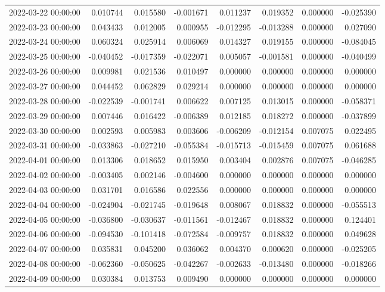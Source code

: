 \begin{tabular}{lrrrrrrr}
2022-03-22 00:00:00 & 0.010744 & 0.015580 & -0.001671 & 0.011237 & 0.019352 & 0.000000 & -0.025390 \\
2022-03-23 00:00:00 & 0.043433 & 0.012005 & 0.000955 & -0.012295 & -0.013288 & 0.000000 & 0.027090 \\
2022-03-24 00:00:00 & 0.060324 & 0.025914 & 0.006069 & 0.014327 & 0.019155 & 0.000000 & -0.084045 \\
2022-03-25 00:00:00 & -0.040452 & -0.017359 & -0.022071 & 0.005057 & -0.001581 & 0.000000 & -0.040499 \\
2022-03-26 00:00:00 & 0.009981 & 0.021536 & 0.010497 & 0.000000 & 0.000000 & 0.000000 & 0.000000 \\
2022-03-27 00:00:00 & 0.044452 & 0.062829 & 0.029214 & 0.000000 & 0.000000 & 0.000000 & 0.000000 \\
2022-03-28 00:00:00 & -0.022539 & -0.001741 & 0.006622 & 0.007125 & 0.013015 & 0.000000 & -0.058371 \\
2022-03-29 00:00:00 & 0.007446 & 0.016422 & -0.006389 & 0.012185 & 0.018272 & 0.000000 & -0.037899 \\
2022-03-30 00:00:00 & 0.002593 & 0.005983 & 0.003606 & -0.006209 & -0.012154 & 0.007075 & 0.022495 \\
2022-03-31 00:00:00 & -0.033863 & -0.027210 & -0.055384 & -0.015713 & -0.015459 & 0.007075 & 0.061688 \\
2022-04-01 00:00:00 & 0.013306 & 0.018652 & 0.015950 & 0.003404 & 0.002876 & 0.007075 & -0.046285 \\
2022-04-02 00:00:00 & -0.003405 & 0.002146 & -0.004600 & 0.000000 & 0.000000 & 0.000000 & 0.000000 \\
2022-04-03 00:00:00 & 0.031701 & 0.016586 & 0.022556 & 0.000000 & 0.000000 & 0.000000 & 0.000000 \\
2022-04-04 00:00:00 & -0.024904 & -0.021745 & -0.019648 & 0.008067 & 0.018832 & 0.000000 & -0.055513 \\
2022-04-05 00:00:00 & -0.036800 & -0.030637 & -0.011561 & -0.012467 & 0.018832 & 0.000000 & 0.124401 \\
2022-04-06 00:00:00 & -0.094530 & -0.101418 & -0.072584 & -0.009757 & 0.018832 & 0.000000 & 0.049628 \\
2022-04-07 00:00:00 & 0.035831 & 0.045200 & 0.036062 & 0.004370 & 0.000620 & 0.000000 & -0.025205 \\
2022-04-08 00:00:00 & -0.062360 & -0.050625 & -0.042267 & -0.002633 & -0.013480 & 0.000000 & -0.018266 \\
2022-04-09 00:00:00 & 0.030384 & 0.013753 & 0.009490 & 0.000000 & 0.000000 & 0.000000 & 0.000000 \\

\end{tabular}
